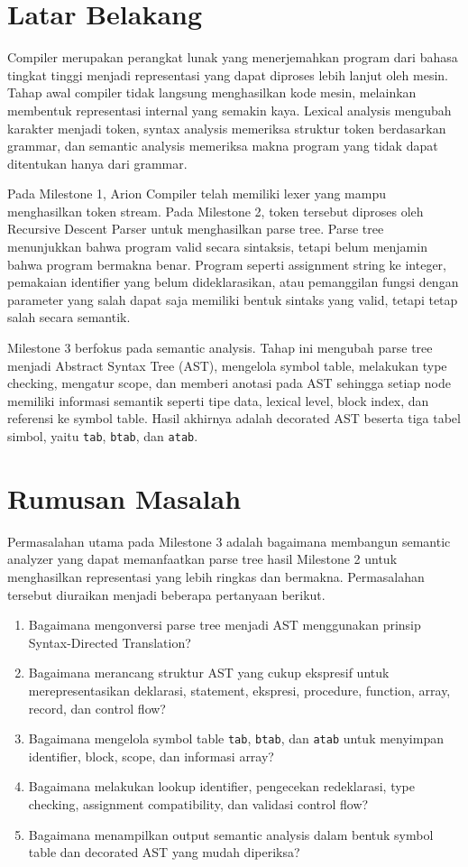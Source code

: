 \section{Latar Belakang}
Compiler merupakan perangkat lunak yang menerjemahkan program dari bahasa tingkat tinggi menjadi representasi yang dapat diproses lebih lanjut oleh mesin. Tahap awal compiler tidak langsung menghasilkan kode mesin, melainkan membentuk representasi internal yang semakin kaya. Lexical analysis mengubah karakter menjadi token, syntax analysis memeriksa struktur token berdasarkan grammar, dan semantic analysis memeriksa makna program yang tidak dapat ditentukan hanya dari grammar.

Pada Milestone 1, Arion Compiler telah memiliki lexer yang mampu menghasilkan token stream. Pada Milestone 2, token tersebut diproses oleh Recursive Descent Parser untuk menghasilkan parse tree. Parse tree menunjukkan bahwa program valid secara sintaksis, tetapi belum menjamin bahwa program bermakna benar. Program seperti assignment string ke integer, pemakaian identifier yang belum dideklarasikan, atau pemanggilan fungsi dengan parameter yang salah dapat saja memiliki bentuk sintaks yang valid, tetapi tetap salah secara semantik.

Milestone 3 berfokus pada semantic analysis. Tahap ini mengubah parse tree menjadi Abstract Syntax Tree (AST), mengelola symbol table, melakukan type checking, mengatur scope, dan memberi anotasi pada AST sehingga setiap node memiliki informasi semantik seperti tipe data, lexical level, block index, dan referensi ke symbol table. Hasil akhirnya adalah decorated AST beserta tiga tabel simbol, yaitu \texttt{tab}, \texttt{btab}, dan \texttt{atab}.

\section{Rumusan Masalah}
Permasalahan utama pada Milestone 3 adalah bagaimana membangun semantic analyzer yang dapat memanfaatkan parse tree hasil Milestone 2 untuk menghasilkan representasi yang lebih ringkas dan bermakna. Permasalahan tersebut diuraikan menjadi beberapa pertanyaan berikut.

\begin{enumerate}
    \item Bagaimana mengonversi parse tree menjadi AST menggunakan prinsip Syntax-Directed Translation?
    \item Bagaimana merancang struktur AST yang cukup ekspresif untuk merepresentasikan deklarasi, statement, ekspresi, procedure, function, array, record, dan control flow?
    \item Bagaimana mengelola symbol table \texttt{tab}, \texttt{btab}, dan \texttt{atab} untuk menyimpan identifier, block, scope, dan informasi array?
    \item Bagaimana melakukan lookup identifier, pengecekan redeklarasi, type checking, assignment compatibility, dan validasi control flow?
    \item Bagaimana menampilkan output semantic analysis dalam bentuk symbol table dan decorated AST yang mudah diperiksa?
\end{enumerate}

